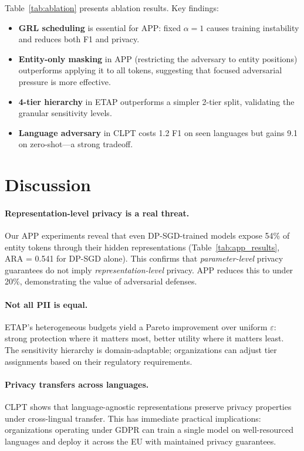 \documentclass[11pt,a4paper]{article}
\begin{document}
Table~\ref{tab:ablation} presents ablation results.  Key findings:
\begin{itemize}
    \item \textbf{GRL scheduling} is essential for APP: fixed $\alpha = 1$
    causes training instability and reduces both F1 and privacy.
    \item \textbf{Entity-only masking} in APP (restricting the adversary to
    entity positions) outperforms applying it to all tokens, suggesting that
    focused adversarial pressure is more effective.
    \item \textbf{4-tier hierarchy} in ETAP outperforms a simpler 2-tier split,
    validating the granular sensitivity levels.
    \item \textbf{Language adversary} in CLPT costs 1.2 F1 on seen languages
    but gains 9.1 on zero-shot—a strong tradeoff.
\end{itemize}

\section{Discussion}
\label{sec:discussion}

\paragraph{Representation-level privacy is a real threat.}
Our APP experiments reveal that even DP-SGD-trained models expose 54\% of
entity tokens through their hidden representations (Table~\ref{tab:app_results},
ARA = 0.541 for DP-SGD alone).  This confirms that \emph{parameter-level}
privacy guarantees do not imply \emph{representation-level} privacy.  APP
reduces this to under 20\%, demonstrating the value of adversarial defenses.

\paragraph{Not all PII is equal.}
ETAP's heterogeneous budgets yield a Pareto improvement over uniform
$\varepsilon$: strong protection where it matters most, better utility where it
matters least.  The sensitivity hierarchy is domain-adaptable; organizations
can adjust tier assignments based on their regulatory requirements.

\paragraph{Privacy transfers across languages.}
CLPT shows that language-agnostic representations preserve privacy properties
under cross-lingual transfer.  This has immediate practical implications:
organizations operating under GDPR can train a single model on well-resourced
languages and deploy it across the EU with maintained privacy guarantees.
\end{document}
